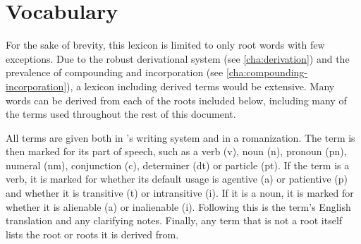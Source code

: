 \chapter{Vocabulary}
\label{app:vocabulary}

\newenvironment{vocab}[1]{
	\begin{center}
		\textbf{\Large \scr{#1} {\sffamily #1}}
	\end{center}
	\begin{multicols}{2}
		\setlength{\parindent}{0em}
		\everypar{\setlength{\hangindent}{1em}}
		}%
		{
	\end{multicols}
	}

\newcommand{\lexdefn}[2]{ $\bullet$~\textit{#1} :~#2}
\newcommand{\lexterm}[3]{\scr{#1} \textbf{\fw{#1}}\lexdefn{#2}{#3}}
\newcommand{\lexetym}[1]{ ;~from \fw{#1}}
\newcommand{\lexetymt}[2]{ ;~from \fw{#1}, \fw{#2}}

For the sake of brevity, this lexicon is limited to only root words with few exceptions. Due to the robust derivational system (see \autoref{cha:derivation}) and the prevalence of compounding and incorporation (see \autoref{cha:compounding-incorporation}), a lexicon including derived terms would be extensive. Many words can be derived from each of the roots included below, including many of the terms used throughout the rest of this document.

All terms are given both in \lang{}'s writing system and in a romanization. The term is then marked for its part of speech, such as a verb (v), noun (n), pronoun (pn), numeral (nm), conjunction (c), determiner (dt) or particle (pt). If the term is a verb, it is marked for whether its default usage is agentive (a) or patientive (p) and whether it is transitive (t) or intransitive (i). If it is a noun, it is marked for whether it is alienable (a) or inalienable (i). Following this is the term's English translation and any clarifying notes. Finally, any term that is not a root itself lists the root or roots it is derived from.

